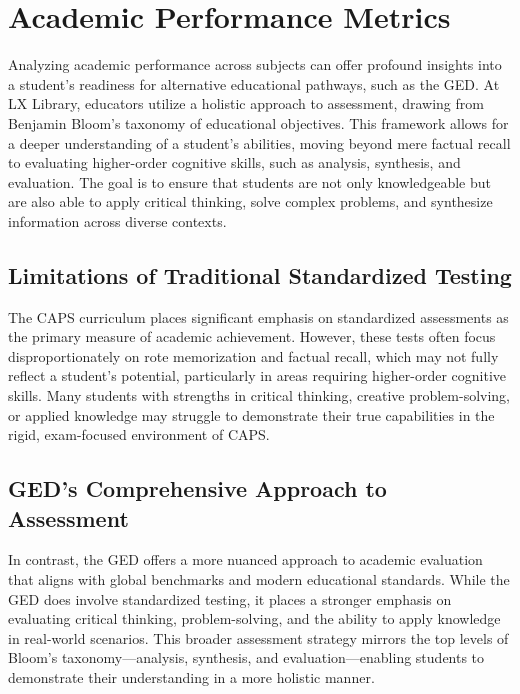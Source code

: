 \documentclass[12pt]{article}
\begin{document}
\section{Academic Performance Metrics}

Analyzing academic performance across subjects can offer profound insights into a student's readiness for alternative educational pathways, such as the GED. At LX Library, educators utilize a holistic approach to assessment, drawing from Benjamin Bloom’s taxonomy of educational objectives. This framework allows for a deeper understanding of a student’s abilities, moving beyond mere factual recall to evaluating higher-order cognitive skills, such as analysis, synthesis, and evaluation. The goal is to ensure that students are not only knowledgeable but are also able to apply critical thinking, solve complex problems, and synthesize information across diverse contexts.

\subsection{Limitations of Traditional Standardized Testing}

The CAPS curriculum places significant emphasis on standardized assessments as the primary measure of academic achievement. However, these tests often focus disproportionately on rote memorization and factual recall, which may not fully reflect a student's potential, particularly in areas requiring higher-order cognitive skills. Many students with strengths in critical thinking, creative problem-solving, or applied knowledge may struggle to demonstrate their true capabilities in the rigid, exam-focused environment of CAPS.

\subsection{GED’s Comprehensive Approach to Assessment}

In contrast, the GED offers a more nuanced approach to academic evaluation that aligns with global benchmarks and modern educational standards. While the GED does involve standardized testing, it places a stronger emphasis on evaluating critical thinking, problem-solving, and the ability to apply knowledge in real-world scenarios. This broader assessment strategy mirrors the top levels of Bloom’s taxonomy—analysis, synthesis, and evaluation—enabling students to demonstrate their understanding in a more holistic manner.
\end{document}
